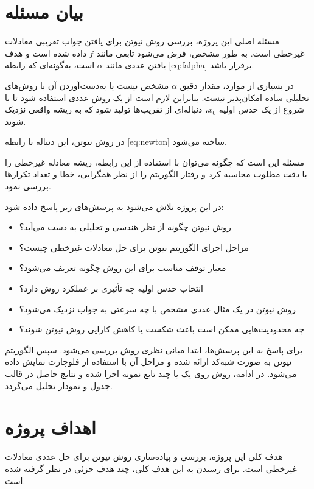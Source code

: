 \section{بیان مسئله}
\label{sec:state}

مسئله اصلی این پروژه، بررسی روش نیوتن برای یافتن جواب تقریبی معادلات غیرخطی است. به طور مشخص، فرض می‌شود تابعی مانند $f$ داده شده است و هدف یافتن عددی مانند $\alpha$ است، به‌گونه‌ای که رابطه \eqref{eq:falpha} برقرار باشد.

در بسیاری از موارد، مقدار دقیق $\alpha$ مشخص نیست یا به‌دست‌آوردن آن با روش‌های تحلیلی ساده امکان‌پذیر نیست. بنابراین لازم است از یک روش عددی استفاده شود تا با شروع از یک حدس اولیه $x_0$، دنباله‌ای از تقریب‌ها تولید شود که به ریشه واقعی نزدیک شوند.

در روش نیوتن، این دنباله با رابطه \eqref{eq:newton} ساخته می‌شود.

مسئله این است که چگونه می‌توان با استفاده از این رابطه، ریشه معادله غیرخطی را با دقت مطلوب محاسبه کرد و رفتار الگوریتم را از نظر همگرایی، خطا و تعداد تکرارها بررسی نمود.

در این پروژه تلاش می‌شود به پرسش‌های زیر پاسخ داده شود:
\begin{itemize}
    \item روش نیوتن چگونه از نظر هندسی و تحلیلی به دست می‌آید؟
    \item مراحل اجرای الگوریتم نیوتن برای حل معادلات غیرخطی چیست؟
    \item معیار توقف مناسب برای این روش چگونه تعریف می‌شود؟
    \item انتخاب حدس اولیه چه تأثیری بر عملکرد روش دارد؟
    \item روش نیوتن در یک مثال عددی مشخص با چه سرعتی به جواب نزدیک می‌شود؟
    \item چه محدودیت‌هایی ممکن است باعث شکست یا کاهش کارایی روش نیوتن شوند؟
\end{itemize}

برای پاسخ به این پرسش‌ها، ابتدا مبانی نظری روش بررسی می‌شود. سپس الگوریتم نیوتن به صورت شبه‌کد ارائه شده و مراحل آن با استفاده از فلوچارت نمایش داده می‌شود. در ادامه، روش روی یک یا چند تابع نمونه اجرا شده و نتایج حاصل در قالب جدول و نمودار تحلیل می‌گردد.

\section{اهداف پروژه}

هدف کلی این پروژه، بررسی و پیاده‌سازی روش نیوتن برای حل عددی معادلات غیرخطی است. برای رسیدن به این هدف کلی، چند هدف جزئی در نظر گرفته شده است.

